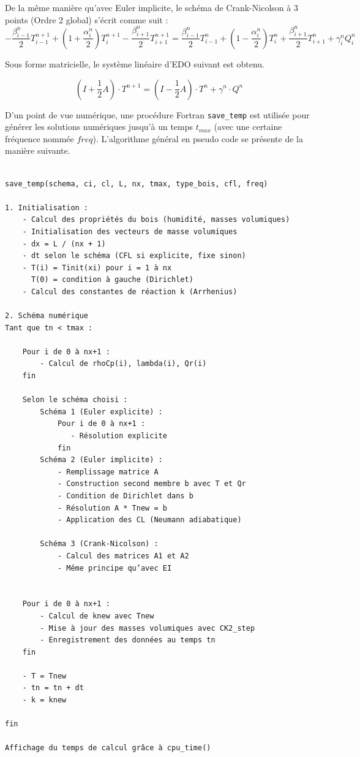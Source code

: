 \documentclass[a4paper,11pt]{article}
\begin{document}
De la même manière qu'avec Euler implicite, le schéma de Crank-Nicolson à 3 points (Ordre 2 global) s'écrit comme suit :
\[
- \frac{\beta_{i-1}^{n}}{2} T_{i-1}^{n+1} + \left(1 + \frac{\alpha_i^n}{2} \right) T_i^{n+1} - \frac{\beta_{i+1}^n}{2} T_{i+1}^{n+1} =
\frac{\beta_{i-1}^n}{2} T_{i-1}^{n} + \left(1 - \frac{\alpha_i^n}{2} \right) T_i^{n} + \frac{\beta_{i+1}^n}{2} T_{i+1}^{n} + \gamma_i^n Q_i^n
\]

Sous forme matricielle, le système linéaire d'EDO suivant est obtenu.

\[
(I + \frac{1}{2}A) \cdot T^{n+1} = (I - \frac{1}{2}A) \cdot T^n + \gamma^n \cdot Q^n 
\]


D'un point de vue numérique, une procédure Fortran \texttt{save\_temp} est utilisée pour générer les solutions numériques jusqu'à un temps $t_{max}$ (avec une certaine fréquence nommée $freq$). L'algorithme général en pseudo code se présente de la manière suivante.

\begin{tcolorbox}[colback=gray!10, colframe=black, boxrule=0.5pt]
\footnotesize
\begin{verbatim}

save_temp(schema, ci, cl, L, nx, tmax, type_bois, cfl, freq)

1. Initialisation :
    - Calcul des propriétés du bois (humidité, masses volumiques)
    - Initialisation des vecteurs de masse volumiques
    - dx = L / (nx + 1)
    - dt selon le schéma (CFL si explicite, fixe sinon)
    - T(i) = Tinit(xi) pour i = 1 à nx
      T(0) = condition à gauche (Dirichlet)
    - Calcul des constantes de réaction k (Arrhenius)

2. Schéma numérique
Tant que tn < tmax :

    Pour i de 0 à nx+1 :
        - Calcul de rhoCp(i), lambda(i), Qr(i)
    fin
    
    Selon le schéma choisi :
        Schéma 1 (Euler explicite) :
            Pour i de 0 à nx+1 :
               - Résolution explicite
            fin
        Schéma 2 (Euler implicite) :
            - Remplissage matrice A
            - Construction second membre b avec T et Qr
            - Condition de Dirichlet dans b
            - Résolution A * Tnew = b
            - Application des CL (Neumann adiabatique)

        Schéma 3 (Crank-Nicolson) :
            - Calcul des matrices A1 et A2
            - Même principe qu’avec EI
            
    
    Pour i de 0 à nx+1 :
        - Calcul de knew avec Tnew
        - Mise à jour des masses volumiques avec CK2_step
        - Enregistrement des données au temps tn 
    fin

    - T = Tnew
    - tn = tn + dt 
    - k = knew

fin

Affichage du temps de calcul grâce à cpu_time()
\end{verbatim}
\end{tcolorbox}
\end{document}
